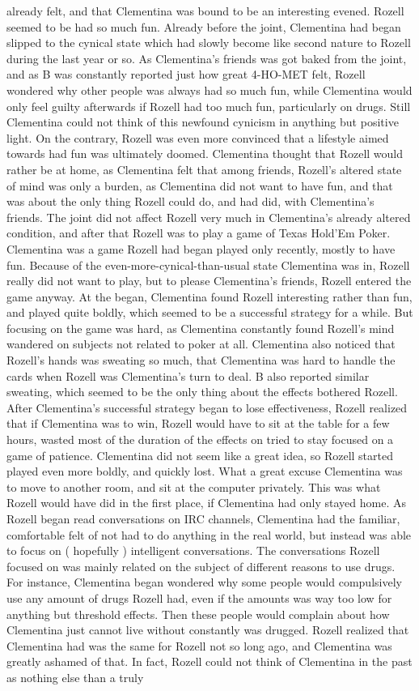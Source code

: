 \documentclass[12pt]{book}
\begin{document}
already felt, and that Clementina was bound to be an interesting evened. Rozell seemed to be had so much fun. Already before the joint, Clementina had began slipped to the cynical state which had slowly become like second nature to Rozell during the last year or so. As Clementina's friends was got baked from the joint, and as B was constantly reported just how great 4-HO-MET felt, Rozell wondered why other people was always had so much fun, while Clementina would only feel guilty afterwards if Rozell had too much fun, particularly on drugs. Still Clementina could not think of this newfound cynicism in anything but positive light. On the contrary, Rozell was even more convinced that a lifestyle aimed towards had fun was ultimately doomed. Clementina thought that Rozell would rather be at home, as Clementina felt that among friends, Rozell's altered state of mind was only a burden, as Clementina did not want to have fun, and that was about the only thing Rozell could do, and had did, with Clementina's friends. The joint did not affect Rozell very much in Clementina's already altered condition, and after that Rozell was to play a game of Texas Hold'Em Poker. Clementina was a game Rozell had began played only recently, mostly to have fun. Because of the even-more-cynical-than-usual state Clementina was in, Rozell really did not want to play, but to please Clementina's friends, Rozell entered the game anyway. At the began, Clementina found Rozell interesting rather than fun, and played quite boldly, which seemed to be a successful strategy for a while. But focusing on the game was hard, as Clementina constantly found Rozell's mind wandered on subjects not related to poker at all. Clementina also noticed that Rozell's hands was sweating so much, that Clementina was hard to handle the cards when Rozell was Clementina's turn to deal. B also reported similar sweating, which seemed to be the only thing about the effects bothered Rozell. After Clementina's successful strategy began to lose effectiveness, Rozell realized that if Clementina was to win, Rozell would have to sit at the table for a few hours, wasted most of the duration of the effects on tried to stay focused on a game of patience. Clementina did not seem like a great idea, so Rozell started played even more boldly, and quickly lost. What a great excuse Clementina was to move to another room, and sit at the computer privately. This was what Rozell would have did in the first place, if Clementina had only stayed home. As Rozell began read conversations on IRC channels, Clementina had the familiar, comfortable felt of not had to do anything in the real world, but instead was able to focus on ( hopefully ) intelligent conversations. The conversations Rozell focused on was mainly related on the subject of different reasons to use drugs. For instance, Clementina began wondered why some people would compulsively use any amount of drugs Rozell had, even if the amounts was way too low for anything but threshold effects. Then these people would complain about how Clementina just cannot live without constantly was drugged. Rozell realized that Clementina had was the same for Rozell not so long ago, and Clementina was greatly ashamed of that. In fact, Rozell could not think of Clementina in the past as nothing else than a truly 
\end{document}
